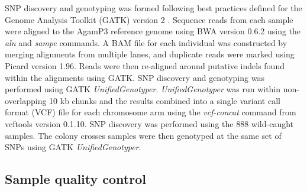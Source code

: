 \documentclass[a4paper,11pt,abstracton,hidelinks]{scrartcl}
\begin{document}
SNP discovery and genotyping was formed following best practices defined for the Genome Analysis Toolkit (GATK) version 2 \citep{McKenna2010,Depristo2011,VanderAuwera2013}.
%
Sequence reads from each sample were aligned to the AgamP3 reference genome \citep{Holt2002,Sharakhova2007} using BWA version 0.6.2 \citep{Li2009} using the \textit{aln} and \textit{sampe} commands.
%
A BAM file for each individual was constructed by merging alignments from multiple lanes, and duplicate reads were marked using Picard version 1.96.
%
Reads were then re-aligned around putative indels found within the alignments using GATK.
%
SNP discovery and genotyping was performed using GATK \textit{UnifiedGenotyper}.
%
\textit{UnifiedGenotyper} was run within non-overlapping 10 kb chunks and the results combined into a single variant call format (VCF) file for each chromosome arm using the \textit{vcf-concat} command from vcftools version 0.1.10.
%
SNP discovery was performed using the 888 wild-caught samples.
%
The colony crosses samples were then genotyped at the same set of SNPs using GATK \textit{UnifiedGenotyper}.


\subsection{Sample quality control}
\end{document}
